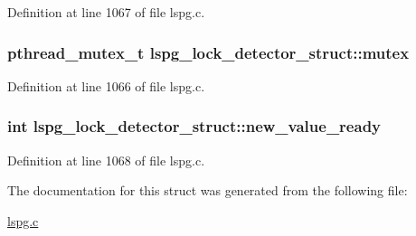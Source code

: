 Definition at line 1067 of file lspg.\-c.

\hypertarget{structlspg__lock__detector__struct_ab5ab5534b376a8fbafdd0b54cec4483c}{
\subsubsection[{mutex}]{\setlength{\rightskip}{0pt plus 5cm}pthread\-\_\-mutex\-\_\-t lspg\-\_\-lock\-\_\-detector\-\_\-struct\-::mutex}}\label{structlspg__lock__detector__struct_ab5ab5534b376a8fbafdd0b54cec4483c}


Definition at line 1066 of file lspg.\-c.

\hypertarget{structlspg__lock__detector__struct_a62373414b815fe178edd8522b3bd4d78}{
\subsubsection[{new\-\_\-value\-\_\-ready}]{\setlength{\rightskip}{0pt plus 5cm}int lspg\-\_\-lock\-\_\-detector\-\_\-struct\-::new\-\_\-value\-\_\-ready}}\label{structlspg__lock__detector__struct_a62373414b815fe178edd8522b3bd4d78}


Definition at line 1068 of file lspg.\-c.



The documentation for this struct was generated from the following file\-:\begin{DoxyCompactItemize}
\item 
\hyperlink{lspg_8c}{lspg.\-c}\end{DoxyCompactItemize}
